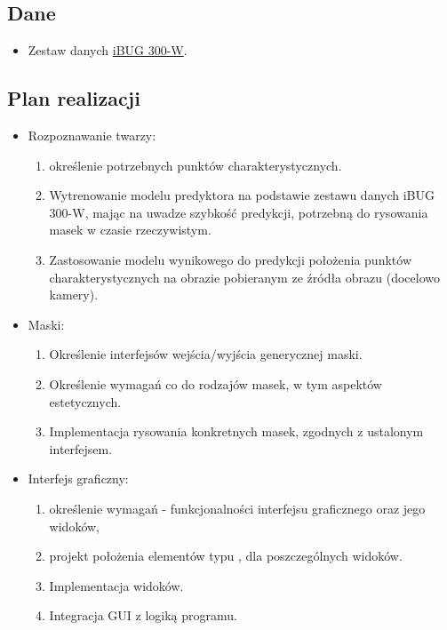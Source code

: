 
\subsection{Dane}
\begin{itemize}
\item Zestaw danych \href{https://ibug.doc.ic.ac.uk/resources/300-W/}{iBUG 300-W}\cite{300-w}. 
\end{itemize}


\subsection{Plan realizacji}
\begin{itemize}

    \item Rozpoznawanie twarzy: 
    \begin{enumerate}
        \item określenie potrzebnych punktów charakterystycznych.
        \item Wytrenowanie modelu predyktora na podstawie zestawu danych iBUG 300-W\cite{300-w}, mając na uwadze szybkość predykcji, potrzebną do rysowania masek w czasie rzeczywistym. 
        \item Zastosowanie modelu wynikowego do predykcji położenia punktów charakterystycznych na obrazie pobieranym ze źródła obrazu (docelowo kamery).
    \end{enumerate}
  
    \item Maski:
    \begin{enumerate}
        \item Określenie interfejsów wejścia/wyjścia generycznej maski.
        \item Określenie wymagań co do rodzajów masek, w tym aspektów estetycznych.
        \item Implementacja rysowania konkretnych masek, zgodnych z ustalonym interfejsem.
    \end{enumerate}
  
    \item Interfejs graficzny:
    \begin{enumerate}
        \item określenie wymagań - funkcjonalności interfejsu graficznego oraz jego widoków,
        \item projekt położenia elementów typu , dla poszczególnych widoków.
        \item Implementacja widoków.
        \item Integracja GUI z logiką programu.
    \end{enumerate}

\end{itemize} 
